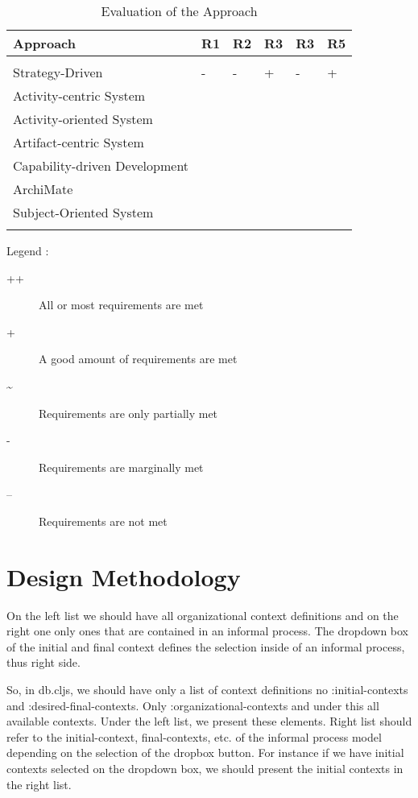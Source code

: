 \begin{center}
	\begin{longtable}{p{5cm}p{2cm}p{2cm}p{2cm}p{2cm}p{2cm}} 
		\toprule 
		\textbf{Approach} & \textbf{R1}  & \textbf{R2}  & \textbf{R3}  & \textbf{R3}  & \textbf{R5} \\
		\midrule
		\endfirsthead
		\\
	   	Strategy-Driven & -  & -  & +  & -  & + \\
	   	Activity-centric System  \\
	   	Activity-oriented System  \\
	   	Artifact-centric System  \\
	   	Capability-driven Development \\
	   	ArchiMate \\
	    Subject-Oriented System \\
		
		\bottomrule
		\caption{Evaluation of the Approach}
		\label{tab:evaluationoftheapproach}
	\end{longtable}	
\end{center}

Legend :
\begin{description}
	\item[++]  All or most requirements are met
	\item[+]   A good amount of requirements are met
	\item[\~]  Requirements are only partially met
	\item[-]   Requirements are marginally met
	\item[--]  Requirements are not met
\end{description}

\section{Design Methodology}
\label{sec:designmethodology}

On the left list we should have all organizational context definitions and on the right one only ones that are contained in an informal process. The dropdown box of the initial and final context defines the selection inside of an informal process, thus right side.

So, in db.cljs, we should have only a list of context definitions no :initial-contexts and :desired-final-contexts. Only :organizational-contexts and under this all available contexts. Under the left list, we present these elements. Right list should refer to the initial-context, final-contexts, etc. of the informal process model depending on the selection of the dropbox button. For instance if we have initial contexts selected on the dropdown box, we should present the initial contexts in the right list.

